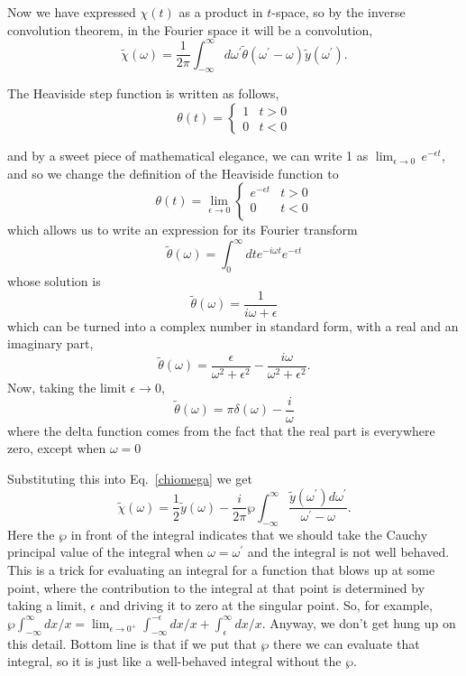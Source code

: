 \documentclass[]{revtex4}
\newcommand{\sm}[1]{{\[#1\]}}
\begin{document}
Now we have expressed $\chi(t)$ as a product in $t$-space, so by the inverse convolution theorem, in the Fourier space it will be
a convolution,
\sm{\tilde{\chi}(\omega)=\frac{1}{2\pi}\int_{-\infty}^{\infty}d\omega^\prime\tilde{\theta}(\omega^\prime-\omega)\tilde{y}(\omega^\prime).\label{chiomega}}

The Heaviside step function is written as follows,
\sm{\theta(t)=
      \begin{cases}1 & t>0 \\0&t<0
      \end{cases}}

and by a sweet piece of mathematical elegance, we can write 1 as $\lim_{\epsilon\rightarrow 0}\,e^{-\epsilon t}$, and so we change the
definition of the Heaviside function to
\sm{\theta(t)=\lim_{\epsilon\rightarrow 0}\begin{cases}e^{-\epsilon t}&t>0\\0&t<0\\\end{cases}}
which allows us to write an expression for its Fourier transform
\sm{\tilde{\theta}(\omega)=\int_0^\infty dt e^{-i\omega t}e^{-\epsilon t}}
whose solution is
\sm{\tilde{\theta}(\omega)=\frac{1}{i\omega+\epsilon}}
which can be turned into a complex number in standard form, with a real and an imaginary part,
\sm{\tilde{\theta}(\omega)=\frac{\epsilon}{\omega^2+\epsilon^2}-\frac{i\omega}{\omega^2+\epsilon^2}.}
Now, taking the limit $\epsilon\rightarrow 0$,
\sm{\tilde{\theta}(\omega)=\pi\delta(\omega)-\frac{i}{\omega}}
where the delta function comes from the fact that the real part is everywhere zero, except when $\omega=0$

Substituting this into Eq.~\ref{chiomega} we get
\sm{\tilde{\chi}(\omega) = \frac{1}{2}\tilde{y}(\omega)-\frac{i}{2\pi}\wp\int_{-\infty}^\infty \frac{\tilde{y}(\omega^\prime)d\omega^\prime}{\omega^\prime-\omega}.\label{chiasy}}
Here the $\wp$ in front of the integral indicates that we should take the Cauchy principal value of the integral when $\omega = \omega^\prime$ and the
integral is not well behaved.  This is a trick for evaluating an integral for a function that blows up at some point, where the contribution to the integral at
that point is determined by taking a limit, $\epsilon$ and driving it to zero at the singular point.
So, for example, $\wp\int_{-\infty}^\infty dx/x = \lim_{\epsilon\rightarrow 0^+}\int_{-\infty}^{-\epsilon} dx/x + \int_{\epsilon}^\infty dx/x$.
Anyway, we don't get hung up on this detail.  Bottom line is that if we put that $\wp$ there we can evaluate that integral, so it is just like a
well-behaved integral without the $\wp$.
\end{document}
